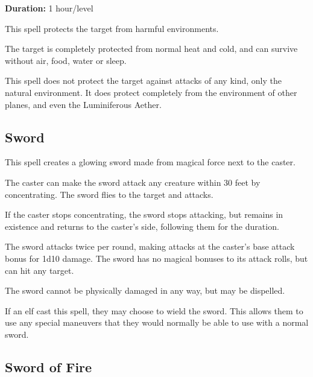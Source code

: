 \begin{multicols*}{2}
{\textbf{Duration:} 1 hour/level}

This spell protects the target from harmful environments.

The target is completely protected from normal heat and cold, and can survive without air, food, water or sleep.

This spell does not protect the target against attacks of any kind, only the natural environment. It does protect completely from the environment of other planes, and even the Luminiferous Aether.

\subsection{Sword}\label{spell:Sword}

This spell creates a glowing sword made from magical force next to the caster.

The caster can make the sword attack any creature within 30 feet by concentrating. The sword flies to the target and attacks.

If the caster stops concentrating, the sword stops attacking, but remains in existence and returns to the caster’s side, following them for the duration.

The sword attacks twice per round, making attacks at the caster’s base attack bonus for 1d10 damage. The sword has no magical bonuses to its attack rolls, but can hit any target.

The sword cannot be physically damaged in any way, but may be dispelled.

If an elf cast this spell, they may choose to wield the sword. This allows them to use any special maneuvers that they would normally be able to use with a normal sword.

\subsection{Sword of Fire}\label{spell:Sword of Fire}




\end{multicols*}
